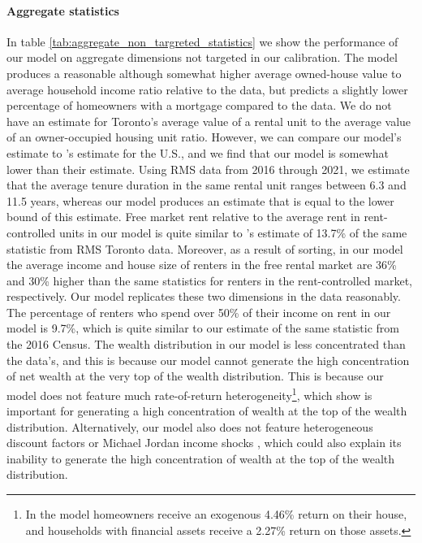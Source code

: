 \documentclass[parskip=full]{article}
\begin{document}
\paragraph{Aggregate statistics} In table \ref{tab:aggregate_non_targreted_statistics} we show the performance of our model on aggregate dimensions not targeted in our calibration. The model produces a reasonable although somewhat higher average owned-house value to average household income ratio relative to the data, but predicts a slightly lower percentage of homeowners with a mortgage compared to the data. We do not have an estimate for Toronto's average value of a rental unit to the average value of an owner-occupied housing unit ratio. However, we can compare our model's estimate to \citet{chatterjee-eyigungor-2015}'s estimate for the U.S., and we find that our model is somewhat lower than their estimate. Using RMS data from 2016 through 2021, we estimate that the average tenure duration in the same rental unit ranges between 6.3 and 11.5 years, whereas our model produces an estimate that is equal to the lower bound of this estimate. Free market rent relative to the average rent in rent-controlled units in our model is quite similar to \citet{zhang-gou}'s estimate of 13.7\% of the same statistic from RMS Toronto data. Moreover, as a result of sorting, in our model the average income and house size of renters in the free rental market are 36\% and 30\% higher than the same statistics for renters in the rent-controlled market, respectively. Our model replicates these two dimensions in the data reasonably. The percentage of renters who spend over 50\% of their income on rent in our model is 9.7\%, which is quite similar to our estimate of the same statistic from the 2016 Census. The wealth distribution in our model is less concentrated than the data's, and this is because our model cannot generate the high concentration of net wealth at the very top of the wealth distribution. This is because our model does not feature much rate-of-return heterogeneity\footnote{In the model homeowners receive an exogenous 4.46\% return on their house, and households with financial assets receive a 2.27\% return on those assets.}, which \citet{fagereng} show is important for generating a high concentration of wealth at the top of the wealth distribution. Alternatively, our model also does not feature heterogeneous discount factors \citep{ks-1998} or Michael Jordan income shocks \citep{mj-shocks}, which could also explain its inability to generate the high concentration of wealth at the top of the wealth distribution.
\end{document}

